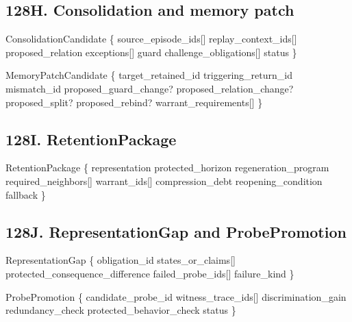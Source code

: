 \documentclass[
]{article}
\newenvironment{Shaded}{}{}
\newcommand{\NormalTok}[1]{#1}
\begin{document}
\subsection{128H. Consolidation and memory patch}\label{consolidation-memory-patch}

\begin{Shaded}
\begin{Highlighting}[]
\NormalTok{ConsolidationCandidate \{}
\NormalTok{    source\_episode\_ids[]}
\NormalTok{    replay\_context\_ids[]}
\NormalTok{    proposed\_relation}
\NormalTok{    exceptions[]}
\NormalTok{    guard}
\NormalTok{    challenge\_obligations[]}
\NormalTok{    status}
\NormalTok{\}}

\NormalTok{MemoryPatchCandidate \{}
\NormalTok{    target\_retained\_id}
\NormalTok{    triggering\_return\_id}
\NormalTok{    mismatch\_id}
\NormalTok{    proposed\_guard\_change?}
\NormalTok{    proposed\_relation\_change?}
\NormalTok{    proposed\_split?}
\NormalTok{    proposed\_rebind?}
\NormalTok{    warrant\_requirements[]}
\NormalTok{\}}
\end{Highlighting}
\end{Shaded}

\subsection{128I. RetentionPackage}\label{retentionpackage}

\begin{Shaded}
\begin{Highlighting}[]
\NormalTok{RetentionPackage \{}
\NormalTok{    representation}
\NormalTok{    protected\_horizon}
\NormalTok{    regeneration\_program}
\NormalTok{    required\_neighbors[]}
\NormalTok{    warrant\_ids[]}
\NormalTok{    compression\_debt}
\NormalTok{    reopening\_condition}
\NormalTok{    fallback}
\NormalTok{\}}
\end{Highlighting}
\end{Shaded}

\subsection{128J. RepresentationGap and ProbePromotion}\label{representationgap-probepromotion}

\begin{Shaded}
\begin{Highlighting}[]
\NormalTok{RepresentationGap \{}
\NormalTok{    obligation\_id}
\NormalTok{    states\_or\_claims[]}
\NormalTok{    protected\_consequence\_difference}
\NormalTok{    failed\_probe\_ids[]}
\NormalTok{    failure\_kind}
\NormalTok{\}}

\NormalTok{ProbePromotion \{}
\NormalTok{    candidate\_probe\_id}
\NormalTok{    witness\_trace\_ids[]}
\NormalTok{    discrimination\_gain}
\NormalTok{    redundancy\_check}
\NormalTok{    protected\_behavior\_check}
\NormalTok{    status}
\NormalTok{\}}
\end{Highlighting}
\end{Shaded}
\end{document}
